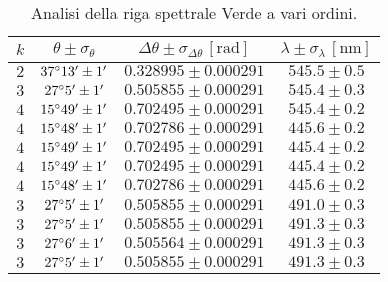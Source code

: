 \documentclass[]{article}
\begin{document}
    \begin{table}
        \centering
        \begin{tabular}{||c|c|c|c||}
            \hline
            $k$ & $\theta \pm \sigma_{\theta}$ & $\Delta\theta \pm \sigma_{\Delta\theta} \, \left[\text{rad}\right]$ & $\lambda \pm \sigma_{\lambda} \, \left[\text{nm}\right]$ \\\hline
            \hline
            $2$ & $37\degree 13' \pm 1'$ & $0.328995 \pm 0.000291$ & $545.5 \pm 0.5$ \\\hline
            $3$ & $27\degree  5' \pm 1'$ & $0.505855 \pm 0.000291$ & $545.4 \pm 0.3$ \\\hline
            $4$ & $15\degree 49' \pm 1'$ & $0.702495 \pm 0.000291$ & $545.4 \pm 0.2$ \\\hline
            $4$ & $15\degree 48' \pm 1'$ & $0.702786 \pm 0.000291$ & $445.6 \pm 0.2$ \\\hline
            $4$ & $15\degree 49' \pm 1'$ & $0.702495 \pm 0.000291$ & $445.4 \pm 0.2$ \\\hline
            $4$ & $15\degree 49' \pm 1'$ & $0.702495 \pm 0.000291$ & $445.4 \pm 0.2$ \\\hline
            $4$ & $15\degree 48' \pm 1'$ & $0.702786 \pm 0.000291$ & $445.6 \pm 0.2$ \\\hline
            $3$ & $27\degree  5' \pm 1'$ & $0.505855 \pm 0.000291$ & $491.0 \pm 0.3$ \\\hline
            $3$ & $27\degree  5' \pm 1'$ & $0.505855 \pm 0.000291$ & $491.3 \pm 0.3$ \\\hline
            $3$ & $27\degree  6' \pm 1'$ & $0.505564 \pm 0.000291$ & $491.3 \pm 0.3$ \\\hline
            $3$ & $27\degree  5' \pm 1'$ & $0.505855 \pm 0.000291$ & $491.3 \pm 0.3$ \\\hline
        \end{tabular}
        \label{verde}
        \caption{Analisi della riga spettrale Verde a vari ordini.}
    \end{table}
\end{document}
